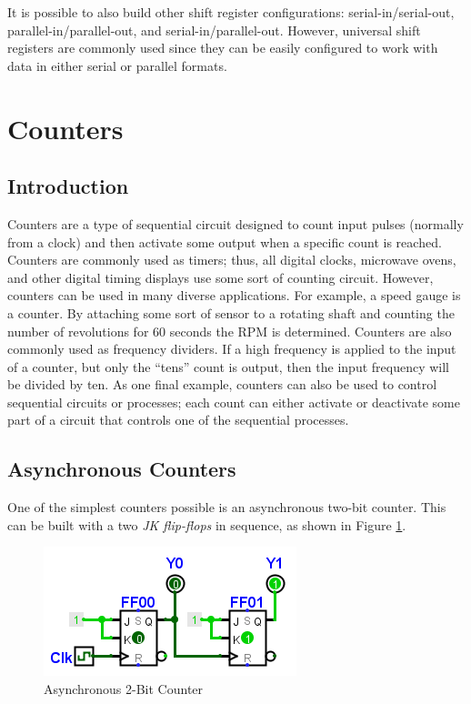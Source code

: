 It is possible to also build other shift register configurations: serial-in/serial-out, parallel-in/parallel-out, and serial-in/parallel-out. However, universal shift registers are commonly used since they can be easily configured to work with data in either serial or parallel formats.

\section{Counters}
\label{SL:sec:counters}

\subsection{Introduction}
\label{SL:subsec:intro_to_counters}

Counters are a type of sequential circuit designed to count input pulses (normally from a clock) and then activate some output when a specific count is reached. Counters are commonly used as timers; thus, all digital clocks, microwave ovens, and other digital timing displays use some sort of counting circuit. However, counters can be used in many diverse applications. For example, a speed gauge is a counter. By attaching some sort of sensor to a rotating shaft and counting the number of revolutions for $ 60 $ seconds the \ac{RPM} is determined. Counters are also commonly used as frequency dividers. If a high frequency is applied to the input of a counter, but only the ``tens'' count is output, then the input frequency will be divided by ten. As one final example, counters can also be used to control sequential circuits or processes; each count can either activate or deactivate some part of a circuit that controls one of the sequential processes. 

\subsection{Asynchronous Counters}
\label{SL:subsec:asynchronous_counters}

One of the simplest counters possible is an asynchronous two-bit counter. This can be built with a two \emph{JK flip-flops} in sequence, as shown in Figure \ref{fig:09_10}.

\begin{figure}[H]
	\centering
	\includegraphics[width=\maxwidth{.95\linewidth}]{gfx/09_10}
	\caption{Asynchronous 2-Bit Counter}
	\label{fig:09_10}
\end{figure}


